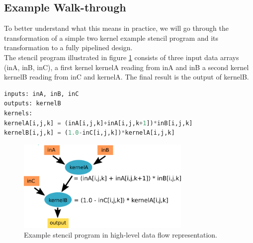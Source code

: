 \subsection{Example Walk-through}
To better understand what this means in practice, we will go through the transformation of a simple two kernel example stencil program and its transformation to a fully pipelined design. \\
The stencil program illustrated in figure \ref{fig:approach-stencil-program} consists of three input data arrays (inA, inB, inC), a first kernel kernelA reading from inA and inB a second kernel kernelB reading from inC and kernelA. The final result is the output of kernelB. \\
\begin{lstlisting}[showstringspaces=false, frame=single, language=Python, label={lst:example-stencil-program}]     
inputs: inA, inB, inC
outputs: kernelB
kernels:
kernelA[i,j,k] = (inA[i,j,k]+inA[i,j,k+1])*inB[i,j,k]
kernelB[i,j,k] = (1.0-inC[i,j,k])*kernelA[i,j,k]
\end{lstlisting}
\begin{figure}[h]
	\centering
	\includegraphics[height=12em]{drawings/approach-stencil-program.png}
	\caption{Example stencil program in high-level data flow representation.}
	\label{fig:approach-stencil-program}
\end{figure}

